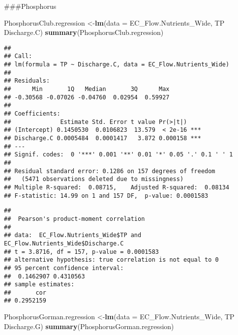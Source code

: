 \documentclass[]{article}
\newenvironment{Shaded}{\begin{snugshade}}{\end{snugshade}}
\newcommand{\CommentTok}[1]{\textcolor[rgb]{0.56,0.35,0.01}{\textit{#1}}}
\newcommand{\DataTypeTok}[1]{\textcolor[rgb]{0.13,0.29,0.53}{#1}}
\newcommand{\KeywordTok}[1]{\textcolor[rgb]{0.13,0.29,0.53}{\textbf{#1}}}
\newcommand{\NormalTok}[1]{#1}
\newcommand{\OperatorTok}[1]{\textcolor[rgb]{0.81,0.36,0.00}{\textbf{#1}}}
\newcommand{\StringTok}[1]{\textcolor[rgb]{0.31,0.60,0.02}{#1}}
\begin{document}
\#\#\#Phosphorus

\begin{Shaded}
\begin{Highlighting}[]
\NormalTok{PhosphorusClub.regression <-}\KeywordTok{lm}\NormalTok{(}\DataTypeTok{data =}\NormalTok{ EC_Flow.Nutrients_Wide, TP }\OperatorTok{~}\StringTok{ }\NormalTok{Discharge.C)}
\KeywordTok{summary}\NormalTok{(PhosphorusClub.regression)}
\end{Highlighting}
\end{Shaded}

\begin{verbatim}
## 
## Call:
## lm(formula = TP ~ Discharge.C, data = EC_Flow.Nutrients_Wide)
## 
## Residuals:
##      Min       1Q   Median       3Q      Max 
## -0.30568 -0.07026 -0.04760  0.02954  0.59927 
## 
## Coefficients:
##              Estimate Std. Error t value Pr(>|t|)    
## (Intercept) 0.1450530  0.0106823  13.579  < 2e-16 ***
## Discharge.C 0.0005484  0.0001417   3.872 0.000158 ***
## ---
## Signif. codes:  0 '***' 0.001 '**' 0.01 '*' 0.05 '.' 0.1 ' ' 1
## 
## Residual standard error: 0.1286 on 157 degrees of freedom
##   (5471 observations deleted due to missingness)
## Multiple R-squared:  0.08715,    Adjusted R-squared:  0.08134 
## F-statistic: 14.99 on 1 and 157 DF,  p-value: 0.0001583
\end{verbatim}

\begin{Shaded}
\end{Shaded}

\begin{verbatim}
## 
##  Pearson's product-moment correlation
## 
## data:  EC_Flow.Nutrients_Wide$TP and EC_Flow.Nutrients_Wide$Discharge.C
## t = 3.8716, df = 157, p-value = 0.0001583
## alternative hypothesis: true correlation is not equal to 0
## 95 percent confidence interval:
##  0.1462907 0.4310563
## sample estimates:
##       cor 
## 0.2952159
\end{verbatim}

\begin{Shaded}
\begin{Highlighting}[]
\NormalTok{PhosphorusGorman.regression <-}\KeywordTok{lm}\NormalTok{(}\DataTypeTok{data =}\NormalTok{ EC_Flow.Nutrients_Wide, TP }\OperatorTok{~}\StringTok{ }\NormalTok{Discharge.G)}
\KeywordTok{summary}\NormalTok{(PhosphorusGorman.regression)}
\end{Highlighting}
\end{Shaded}
\end{document}

